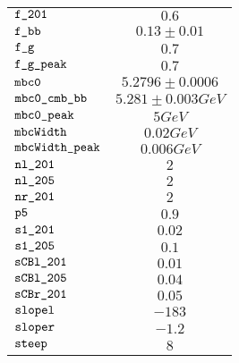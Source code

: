 \begin{tabular}{lc}
$\verb+f_201+ $ & $  0.6$\\
$\verb+f_bb+ $ & $  0.13\pm 0.01$\\
$\verb+f_g+ $ & $  0.7$\\
$\verb+f_g_peak+ $ & $  0.7$\\
$\verb+mbc0+ $ & $  5.2796\pm 0.0006$\\
$\verb+mbc0_cmb_bb+ $ & $  5.281\pm 0.003 GeV$\\
$\verb+mbc0_peak+ $ & $  5 GeV$\\
$\verb+mbcWidth+ $ & $  0.02 GeV$\\
$\verb+mbcWidth_peak+ $ & $  0.006 GeV$\\
$\verb+nl_201+ $ & $  2$\\
$\verb+nl_205+ $ & $  2$\\
$\verb+nr_201+ $ & $  2$\\
$\verb+p5+ $ & $  0.9$\\
$\verb+s1_201+ $ & $  0.02$\\
$\verb+s1_205+ $ & $  0.1$\\
$\verb+sCBl_201+ $ & $  0.01$\\
$\verb+sCBl_205+ $ & $  0.04$\\
$\verb+sCBr_201+ $ & $  0.05$\\
$\verb+slopel+ $ & $ -183$\\
$\verb+sloper+ $ & $ -1.2$\\
$\verb+steep+ $ & $  8$\\
\end{tabular}
